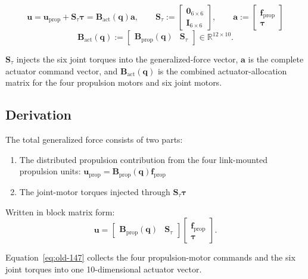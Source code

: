 \documentclass[12pt,a4paper]{report}
\newcommand{\newsymbols}[1]{\par\noindent{}#1\par\vspace{0.35em}}
\newcommand{\formulaannotation}[1]{\par\noindent{}#1\par\vspace{0.35em}}
\begin{document}
\begin{equation}
\mathbf{u}
= \mathbf{u}_{\mathrm{prop}} + \mathbf{S}_{\tau}\boldsymbol{\tau}
= \mathbf{B}_{\mathrm{act}}(\mathbf{q})\mathbf{a},
\qquad
\mathbf{S}_{\tau}
:=
\begin{bmatrix}
\mathbf{0}_{6\times6} \\
\mathbf{I}_{6\times6}
\end{bmatrix},
\qquad
\mathbf{a}
:=
\begin{bmatrix}
\mathbf{f}_{\mathrm{prop}} \\
\boldsymbol{\tau}
\end{bmatrix}
\label{eq:old-147}
\end{equation}
\begin{equation}
\mathbf{B}_{\mathrm{act}}(\mathbf{q})
:=
\begin{bmatrix}
\mathbf{B}_{\mathrm{prop}}(\mathbf{q}) & \mathbf{S}_{\tau}
\end{bmatrix}
\in \mathbb{R}^{12\times10}.
\end{equation}
\newsymbols{$\mathbf{S}_{\tau}$ injects the six joint torques into the generalized-force vector, $\mathbf{a}$ is the complete actuator command vector, and $\mathbf{B}_{\mathrm{act}}(\mathbf{q})$ is the combined actuator-allocation matrix for the four propulsion motors and six joint motors.}

\subsection{Derivation}

The total generalized force consists of two parts:
\begin{enumerate}
    \item The distributed propulsion contribution from the four link-mounted propulsion units: $\mathbf{u}_{\mathrm{prop}} = \mathbf{B}_{\mathrm{prop}}(\mathbf{q}) \mathbf{f}_{\mathrm{prop}}$
    \item The joint-motor torques injected through $\mathbf{S}_{\tau}\boldsymbol{\tau}$
\end{enumerate}

Written in block matrix form:
\begin{equation}
\mathbf{u}
=
\begin{bmatrix}
\mathbf{B}_{\mathrm{prop}}(\mathbf{q}) & \mathbf{S}_{\tau}
\end{bmatrix}
\begin{bmatrix}
\mathbf{f}_{\mathrm{prop}} \\
\boldsymbol{\tau}
\end{bmatrix}.
\end{equation}
\formulaannotation{Equation~\eqref{eq:old-147} collects the four propulsion-motor commands and the six joint torques into one 10-dimensional actuator vector.}
\end{document}
